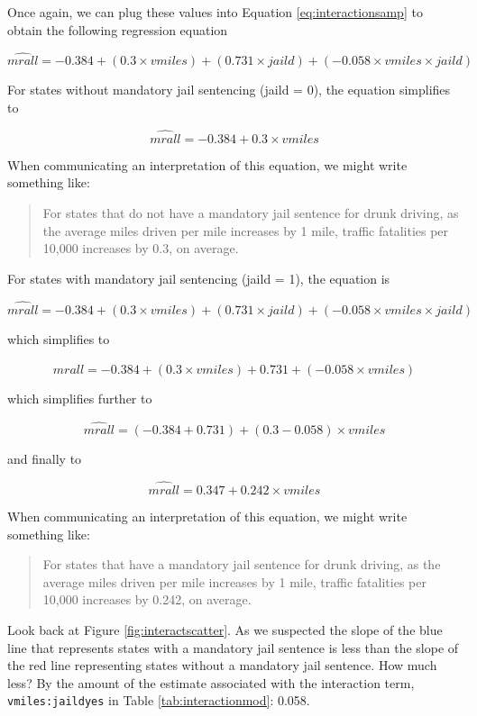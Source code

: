 \documentclass[
]{book}
\begin{document}
Once again, we can plug these values into Equation \eqref{eq:interactionsamp} to obtain the following regression equation

\[\hat{mrall} = -0.384 + (0.3\times vmiles) + (0.731\times jaild) + (-0.058\times vmiles \times jaild)\]

For states without mandatory jail sentencing (jaild = 0), the equation simplifies to

\[\hat{mrall} = -0.384 + 0.3\times vmiles\]

When communicating an interpretation of this equation, we might write something like:

\begin{quote}
For states that do not have a mandatory jail sentence for drunk driving, as the average miles driven per mile increases by 1 mile, traffic fatalities per 10,000 increases by 0.3, on average.
\end{quote}

For states with mandatory jail sentencing (jaild = 1), the equation is

\[\hat{mrall} = -0.384 + (0.3\times vmiles) + (0.731\times jaild) + (-0.058\times vmiles \times jaild)\]

which simplifies to

\[\hat{mrall} = -0.384 + (0.3\times vmiles) + 0.731 + (-0.058\times vmiles)\]

which simplifies further to

\[\hat{mrall} = (-0.384 + 0.731) + (0.3-0.058)\times vmiles\]

and finally to

\[\hat{mrall} = 0.347 + 0.242\times vmiles\]

When communicating an interpretation of this equation, we might write something like:

\begin{quote}
For states that have a mandatory jail sentence for drunk driving, as the average miles driven per mile increases by 1 mile, traffic fatalities per 10,000 increases by 0.242, on average.
\end{quote}

Look back at Figure \ref{fig:interactscatter}. As we suspected the slope of the blue line that represents states with a mandatory jail sentence is less than the slope of the red line representing states without a mandatory jail sentence. How much less? By the amount of the estimate associated with the interaction term, \texttt{vmiles:jaildyes} in Table \ref{tab:interactionmod}: 0.058.
\end{document}
